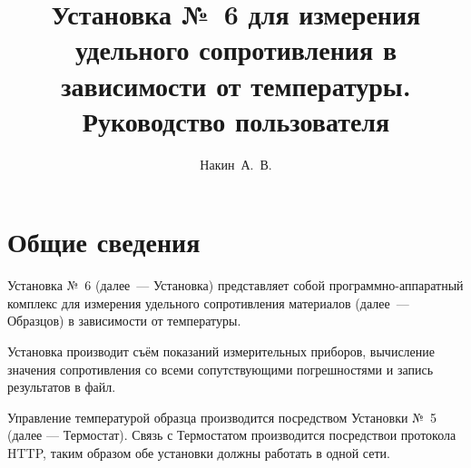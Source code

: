 \documentclass[12pt, a4paper, twocolumn]{report}
\title{Установка №~6 для измерения удельного сопротивления в зависимости от температуры. Руководство пользователя}
\author{Накин~А.~В.}
\begin{document}


\chapter{Общие сведения}

Установка №~6 (далее~--- Установка) представляет собой программно-аппаратный комплекс для измерения удельного сопротивления материалов (далее~--- Образцов) в зависимости от температуры.

Установка производит съём показаний измерительных приборов, вычисление значения сопротивления со всеми сопутствующими погрешностями и запись результатов в файл.

Управление температурой образца производится посредством Установки №~5 (далее --- Термостат). Связь с Термостатом производится посредствои протокола HTTP, таким образом обе установки должны работать в одной сети. 
\end{document}
